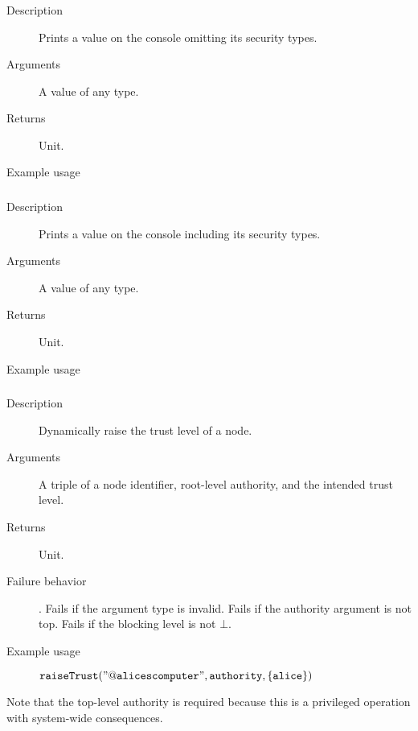 \subsubsection{}
\begin{description}
    \item [Description] Prints a value on the console omitting its security types.
    \item [Arguments] A value of any type.
    \item [Returns] Unit.
    \item [Example usage] 
\end{description}


\subsubsection{}
\begin{description}
    \item [Description] Prints a value on the console including its security types.
    \item [Arguments] A value of any type.
    \item [Returns] Unit.
    \item [Example usage] 
\end{description}


\subsubsection{}
\begin{description}
    \item [Description] Dynamically raise the trust level of a node.
    \item [Arguments] A triple of a node identifier, root-level authority, and the intended trust level.
    \item [Returns] Unit.
    \item [Failure behavior]. Fails if the argument type is invalid. Fails if the authority argument is not top.
 Fails if the blocking level is not $\bot$.
    \item [Example usage] ${\mathtt{raiseTrust("@alicescomputer", authority, \{alice\})}}$
\end{description}
Note that the top-level authority is required because this is a privileged operation with system-wide consequences. 




